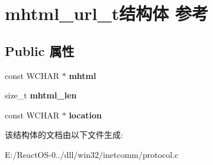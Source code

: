 \hypertarget{structmhtml__url__t}{}\section{mhtml\+\_\+url\+\_\+t结构体 参考}
\label{structmhtml__url__t}
\subsection*{Public 属性}
\begin{DoxyCompactItemize}
\item 
\mbox{\label{structmhtml__url__t_aba6322148f96bb88de4810d43eefb840}} 
const W\+C\+H\+AR $\ast$ {\bfseries mhtml}
\item 
\mbox{\label{structmhtml__url__t_a33d9bcbd353332be7f97a54314e74c40}} 
size\+\_\+t {\bfseries mhtml\+\_\+len}
\item 
\mbox{\label{structmhtml__url__t_a1e61ccda41d993202aeab764d4c36488}} 
const W\+C\+H\+AR $\ast$ {\bfseries location}
\end{DoxyCompactItemize}


该结构体的文档由以下文件生成\+:\begin{DoxyCompactItemize}
\item 
E\+:/\+React\+O\+S-\/0../dll/win32/inetcomm/protocol.\+c\end{DoxyCompactItemize}
